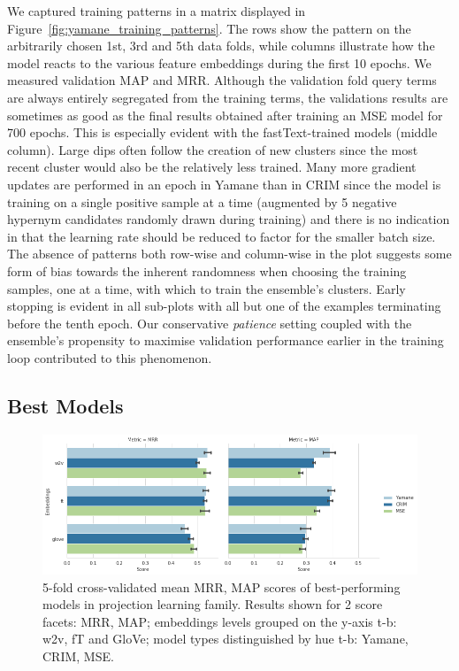We captured training patterns in a matrix displayed in Figure~\ref{fig:yamane_training_patterns}. The rows show the pattern on the arbitrarily chosen 1st, 3rd and 5th data folds, while columns illustrate how the model reacts to the various feature embeddings during the first 10 epochs.  We measured validation \ac{MAP} and \ac{MRR}.  Although the validation fold query terms are always entirely segregated from the training terms, the validations results are sometimes as good as the final results obtained after training an \ac{MSE} model for 700 epochs.  This is especially evident with the  fastText-trained models (middle column).  Large dips often follow the creation of new clusters since the most recent cluster would also be the relatively less trained.  Many more gradient updates are performed in an epoch in Yamane than in CRIM since the model is training on a single positive sample at a time (augmented by 5 negative hypernym candidates randomly drawn during training) and there is no indication in \citet{yamane2016distributional} that the learning rate should be reduced to factor for the smaller batch size.  The absence of patterns both row-wise and column-wise in the plot suggests some form of bias towards the inherent randomness when choosing the training samples, one at a time, with which to train the ensemble's clusters.  Early stopping is evident in all sub-plots with all but one of the examples terminating before the tenth epoch.  Our conservative \textit{patience} setting coupled with the ensemble's propensity to maximise validation performance earlier in the training loop contributed to this phenomenon.

\subsection{Best Models}
\begin{figure}[ht!] 
  \centering
  \includegraphics[width=1.\linewidth]{images/Comparison_of_best_performing_algorithms.png}
  \caption[5-fold cross-validated mean MRR, MAP scores of best-performing models in projection learning family]{5-fold cross-validated mean MRR, MAP scores of best-performing models in projection learning family.  Results shown for 2 score facets: MRR, MAP; embeddings levels grouped on the y-axis t-b: w2v, fT and GloVe; model types distinguished by hue t-b: Yamane, CRIM, MSE.}
  \label{fig:part1_best_models}
\end{figure}

